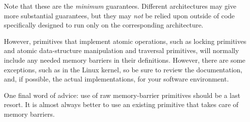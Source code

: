 Note that these are the \emph{minimum} guarantees.
Different architectures may give
more substantial guarantees,
but they may \emph{not}
be relied upon outside of code specifically designed to run only on
the corresponding architecture.

However, primitives that implement atomic operations, such as locking
primitives and atomic data-structure manipulation and traversal primitives,
will normally include any needed memory barriers in their definitions.
However, there are some exceptions, such as  in the
Linux kernel, so be sure to review the documentation, and, if possible,
the actual implementations, for your software environment.

One final word of advice: use of raw memory-barrier primitives should
be a last resort.
It is almost always better to use an existing primitive that takes
care of memory barriers.
